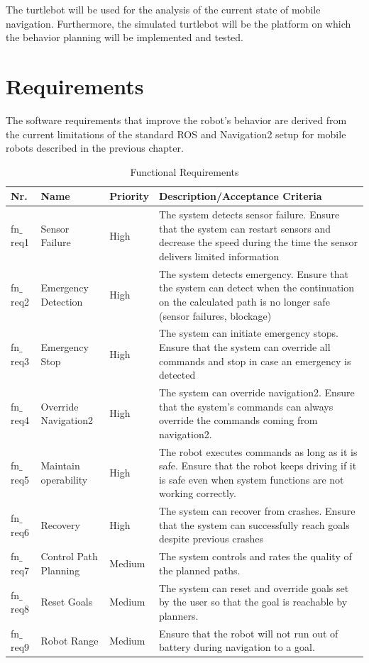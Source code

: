The turtlebot will be used for the analysis of the current state of mobile navigation. Furthermore, the simulated turtlebot will be the platform on which the behavior planning will be implemented and tested.\\


\section{Requirements}

The software requirements that improve the robot's behavior are derived from the current limitations of the standard ROS and Navigation2 setup for mobile robots described in the previous chapter. 

\begin{table}[ht]
\label{tab:fn_req}
\caption{Functional Requirements}
	\begin{tabular}{| m{} | m{}| m{} | m{}|} 
  	\hline
  	Nr. & Name & Priority & Description/Acceptance Criteria \\ 
  	\hline
  	fn$\_$req1 & Sensor Failure & High & The system detects sensor failure. Ensure that the system can restart sensors and decrease the speed during the time the sensor delivers limited information \\ 
  	\hline
  	fn$\_$req2 & Emergency Detection & High & The system detects emergency. Ensure that the system can detect when the continuation on the calculated path is no longer safe (sensor failures, blockage) \\
  	\hline
  	fn$\_$req3 & Emergency Stop & High & The system can initiate emergency stops. Ensure that the system can override all commands and stop in case an emergency is detected \\
  	\hline  	
  	fn$\_$req4 & Override Navigation2 & High & The system can override navigation2. Ensure that the system's commands can always override the commands coming from navigation2. \\
  	\hline
  	fn$\_$req5 & Maintain operability & High & The robot executes commands as long as it is safe. Ensure that the robot keeps driving if it is safe even when system functions are not working correctly. \\
  	\hline
  	fn$\_$req6 & Recovery & High &  The system can recover from crashes. Ensure that the system can successfully reach goals despite previous crashes\\ 
  	\hline  
  	fn$\_$req7 & Control Path Planning & Medium & The system controls and rates the quality of the planned paths. \\
  	\hline	
  	fn$\_$req8 & Reset Goals & Medium & The system can reset and override goals set by the user so that the goal is reachable by planners. \\
  	\hline
  	fn$\_$req9 & Robot Range & Medium & Ensure that the robot will not run out of battery during navigation to a goal.  \\	
  	\hline
	\end{tabular}
\end{table}


